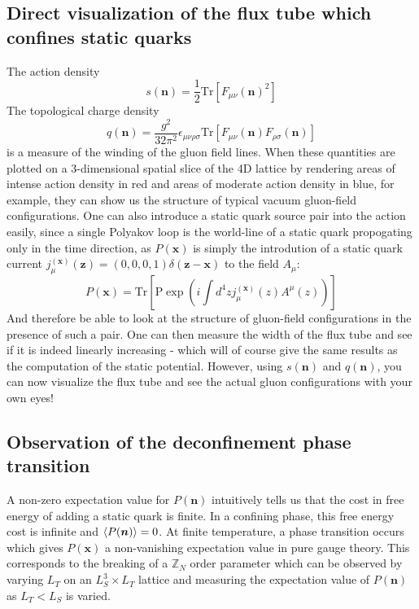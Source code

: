 \documentclass[11pt]{article}
\begin{document}
\subsection{Direct visualization of the flux tube which confines static quarks} 
The action density
	\begin{equation}s(\bm n)=\frac{1}{2}\mathrm{Tr}\left[F_{\mu\nu}(\bm n)^2\right]\end{equation}
	The topological charge density
	\begin{equation}q(\bm n)=\frac{g^2}{32\pi^2}\epsilon_{\mu\nu\rho\sigma}\mathrm{Tr}\left[F_{\mu\nu}(\bm n)F_{\rho\sigma}(\bm n)\right]\end{equation}
	is a measure of the winding of the gluon field lines. When these quantities are plotted on a 3-dimensional spatial slice of the 4D lattice by rendering areas of intense action density in red and areas of moderate action density in blue, for example, they can show us the structure of typical vacuum gluon-field configurations. One can also introduce a static quark source pair into the action easily, since a single Polyakov loop is the world-line of a static quark propogating only in the time direction, as $P(\bm x)$ is simply the introdution of a static quark current $j_\mu^{(\bm x)}(\bm z)=(0,0,0,1)\delta(\bm z-\bm x)$ to the field $A_\mu$:
	\begin{equation}P(\bm x)=\mathrm{Tr}\left[\mathrm{P}\exp\left(i\int d^4 z j^{(\bm x)}_\mu(z)A^\mu(z)\right)\right]\end{equation} 
	And therefore be able to look at the structure of gluon-field configurations in the presence of such a pair. One can then measure the width of the flux tube \cite{ripka2004dual} and see if it is indeed linearly increasing - which will of course give the same results as the computation of the static potential. However, using $s(\bm n)$ and $q(\bm n)$, you can now visualize the flux tube and see the actual gluon configurations with your own eyes!
\subsection{Observation of the deconfinement phase transition} 
	A non-zero expectation value for $P(\bm n)$ intuitively tells us that the cost in free energy of adding a static quark is finite. In a confining phase, this free energy cost is infinite and $\braket{P(\bm n)}=0$. At finite temperature, a phase transition occurs which gives $P(\bm x)$ a non-vanishing expectation value in pure gauge theory. This corresponds to the breaking of a $\mathbb Z_N$ order parameter \cite{greensite2003confinement} which can be observed by varying $L_T$ on an $L_S^3\times L_T$ lattice and measuring the expectation value of $P(\bm n)$ as $L_T<L_S$ is varied.
\end{document}
